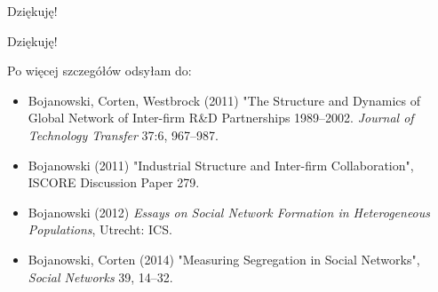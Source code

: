 \documentclass{beamer}
\begin{document}
\begin{frame}
	\begin{center}
		\begin{Huge}
			Dziękuję!
		\end{Huge}
	\end{center}
\end{frame}


\begin{frame}{Dziękuję!}
	\begin{footnotesize}
		Po więcej szczegółów odsyłam do:
		\begin{itemize}
			\item Bojanowski, Corten, Westbrock (2011) "The Structure and Dynamics of
				Global Network of Inter-firm R\&D Partnerships 1989--2002.
				\textit{Journal of Technology Transfer} 37:6, 967--987.
			\item Bojanowski (2011) "Industrial Structure and Inter-firm Collaboration",
				ISCORE Discussion Paper 279.
			\item Bojanowski (2012) \textit{Essays on Social Network Formation in Heterogeneous Populations},
				Utrecht: ICS.
			\item Bojanowski, Corten (2014) "Measuring Segregation in Social Networks",
				\textit{Social Networks} 39, 14--32.
		\end{itemize}
	\end{footnotesize}
\end{frame}
\end{document}
